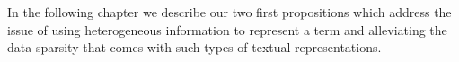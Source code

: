 In the following chapter we describe our two first propositions which address the issue of using heterogeneous information to represent a term and alleviating the data sparsity that comes with such types of textual representations.


%
	

%
%





